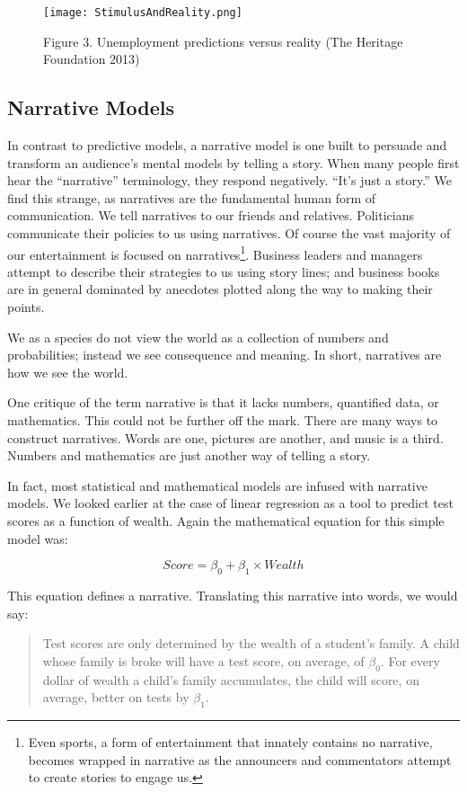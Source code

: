 \documentclass[]{memoir}
\makeatletter
\def\maxwidth{\ifdim\Gin@nat@width>\linewidth\linewidth
\else\Gin@nat@width\fi}
\let\Oldincludegraphics\includegraphics
\renewcommand{\includegraphics}[1]{\Oldincludegraphics[width=\maxwidth]{#1}}
\makeatother
\begin{document}
\begin{figure}[htbp]
\centering
\texttt{[image: StimulusAndReality.png]}
\caption{Figure 3. Unemployment predictions versus reality (The Heritage
Foundation 2013)}
\end{figure}

\subsection{Narrative Models}

In contrast to predictive models, a narrative model is one built to
persuade and transform an audience's mental models by telling a story.
When many people first hear the ``narrative'' terminology, they respond
negatively. ``It's just a story.'' We find this strange, as narratives
are the fundamental human form of communication. We tell narratives to
our friends and relatives. Politicians communicate their policies to us
using narratives. Of course the vast majority of our entertainment is
focused on narratives\footnote{Even sports, a form of entertainment that
  innately contains no narrative, becomes wrapped in narrative as the
  announcers and commentators attempt to create stories to engage us.}.
Business leaders and managers attempt to describe their strategies to us
using story lines; and business books are in general dominated by
anecdotes plotted along the way to making their points.

We as a species do not view the world as a collection of numbers and
probabilities; instead we see consequence and meaning. In short,
narratives are how we see the world.

One critique of the term narrative is that it lacks numbers, quantified
data, or mathematics. This could not be further off the mark. There are
many ways to construct narratives. Words are one, pictures are another,
and music is a third. Numbers and mathematics are just another way of
telling a story.

In fact, most statistical and mathematical models are infused with
narrative models. We looked earlier at the case of linear regression as
a tool to predict test scores as a function of wealth. Again the
mathematical equation for this simple model was:

\[ Score = \beta_0 + \beta_1 \times Wealth \]

This equation defines a narrative. Translating this narrative into
words, we would say:

\begin{quote}
Test scores are only determined by the wealth of a student's family. A
child whose family is broke will have a test score, on average, of
$\beta_0$. For every dollar of wealth a child's family accumulates, the
child will score, on average, better on tests by $\beta_1$.
\end{quote}
\end{document}
